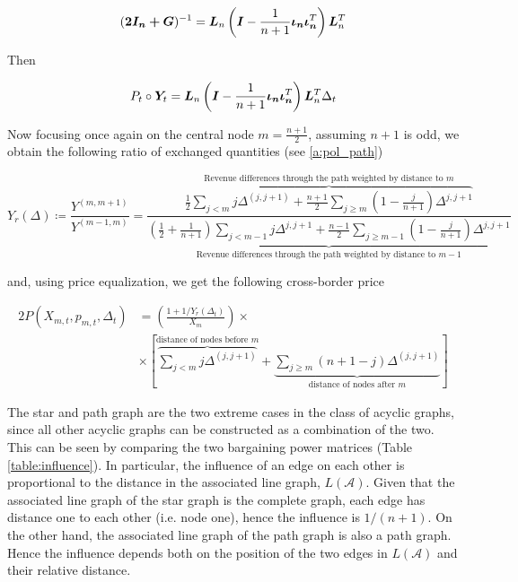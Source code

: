 \begin{equation}
  (\bm{2I_n + \bm{G}})^{-1} = \bm{L}_n  \left(\bm{I} - \frac{1}{n+1} \bm{\iota_n \iota_n}^T\right) \bm{L}_n^T
\end{equation}

Then

\begin{equation*}
  \begin{split}
    P_t \circ \bm{Y}_t &= \bm{L}_n  \left(\bm{I} - \frac{1}{n+1} \bm{\iota_n \iota_n}^T\right) \bm{L}_n^T  \Delta_t \\
  \end{split}
\end{equation*}

Now focusing once again on the central node $m = \frac{n+1}{2}$, assuming $n+1$ is odd, we obtain the following ratio of exchanged quantities (see \ref{a:pol_path})

\begin{equation}
  Y_r(\Delta) \coloneqq \frac{Y^{(m, m+1)}}{Y^{(m-1, m)}}
  = \frac{
    \overbrace{\frac{1}{2} \sum_{j < m} j \Delta^{(j, j+1)} + \frac{n+1}{2}\sum_{j \geq m} \left(1 - \frac{j}{n+1}\right) \Delta^{j, j+1}}^{\text{Revenue differences through the path weighted by distance to } m}
  }{
    \underbrace{\left(\frac{1}{2} + \frac{1}{n+1}\right) \sum_{j < m-1} j \Delta^{j, j+1}+ \frac{n-1}{2} \sum_{j \geq m-1} \left(1 - \frac{j}{n+1}\right) \Delta^{j, j+1}}_{\text{Revenue differences through the path weighted by distance to } m-1}
  }
\end{equation}

and, using price equalization, we get the following cross-border price

\begin{equation} \label{policy_path}
  \begin{split}
    2 P(X_{m, t}, p_{m, t}, \Delta_t) &= \left( \frac{1 + 1 / Y_r(\Delta_t)}{X_m} \right) \times  \\
    &\times \left[ \overbrace{\sum_{j < m} j \Delta^{(j, j + 1)}}^{\text{distance of nodes before } m} +  \underbrace{\sum_{j \geq m}\left(n + 1 - j\right) \Delta^{(j, j + 1)}}_{\text{distance of nodes after } m} \right]
  \end{split}
\end{equation}

The star and path graph are the two extreme cases in the class of acyclic graphs, since all other acyclic graphs can be constructed as a combination of the two. This can be seen by comparing the two bargaining power matrices (Table \ref{table:influence}). In particular, the influence of an edge on each other is proportional to the distance in the associated line graph, $L(\mathcal{A})$. Given that the associated line graph of the star graph is the complete graph, each edge has distance one to each other (i.e. node one), hence the influence is $1 / (n+1)$. On the other hand, the associated line graph of the path graph is also a path graph. Hence the influence depends both on the position of the two edges in $L(\mathcal{A})$ and their relative distance.

